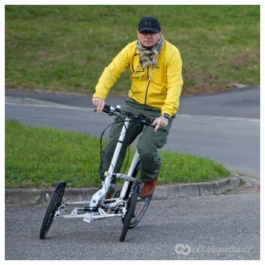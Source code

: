 \begin{figure}[h]
		\endminipage\hfill
		  \includegraphics[width=1.0\linewidth]{figs/02/veleon}
		\endminipage
		\\[0pt]
\end{figure}

